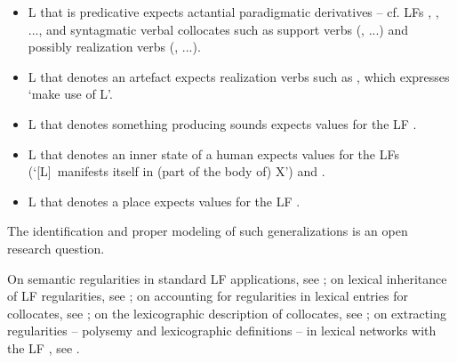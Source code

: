 \begin{itemize}

\item L that is predicative expects actantial paradigmatic derivatives -- cf. LFs , , ..., and syntagmatic verbal collocates such as support verbs (, ...) and possibly realization verbs (, ...).

\item L that denotes an artefact expects realization verbs such as , which expresses `make use of L'.

\item L that denotes something producing sounds expects values for the LF .

\item L that denotes an inner state of a human expects values for the LFs  (`[L]~manifests itself in (part of the body of) X') and .

\item L that denotes a place expects values for the LF .

\end{itemize}

The identification and proper modeling of such generalizations is an open research question.

\begin{furtherreading}
On semantic regularities in standard LF applications, see \textcite{Apresjan2009}; on lexical inheritance of LF regularities, see \textcites{MelcukWanner1996}{Barrios2009}; on accounting for regularities in lexical entries for collocates, see \textcite{Reuther1996}; on the lexicographic description of collocates, see \textcite{AlonsoRamosMantha1996,AlonsoRamos2003}; on extracting regularities -- polysemy and lexicographic definitions -- in lexical networks with the LF , see \textcite{Polguere2022a}.
\end{furtherreading}

